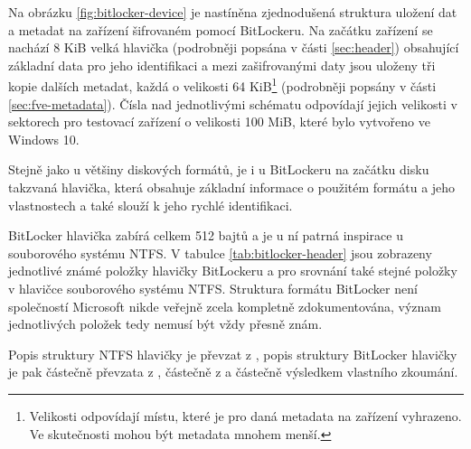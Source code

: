 Na obrázku \ref{fig:bitlocker-device} je nastíněna zjednodušená struktura uložení dat a metadat na zařízení šifrovaném pomocí BitLockeru. Na začátku zařízení se nachází 8 KiB velká hlavička (podrobněji popsána v části \ref{sec:header}) obsahující základní data pro jeho identifikaci a mezi zašifrovanými daty jsou uloženy tři kopie dalších metadat, každá o velikosti 64 KiB\footnote{Velikosti odpovídají místu, které je pro daná metadata na zařízení vyhrazeno. Ve skutečnosti mohou být metadata mnohem menší.} (podrobněji popsány v části \ref{sec:fve-metadata}). Čísla nad jednotlivými  schématu odpovídají jejich velikosti v sektorech pro testovací zařízení o velikosti 100 MiB, které bylo vytvořeno ve Windows 10.

\label{sec:header}

Stejně jako u většiny diskových formátů, je i u BitLockeru na začátku disku takzvaná hlavička, která obsahuje základní informace o použitém formátu a jeho vlastnostech a také slouží k jeho rychlé identifikaci.

BitLocker hlavička zabírá celkem 512 bajtů a je u ní patrná inspirace u souborového systému NTFS. V tabulce \ref{tab:bitlocker-header} jsou zobrazeny jednotlivé známé položky hlavičky BitLockeru a pro srovnání také stejné položky v hlavičce souborového systému NTFS. Struktura formátu BitLocker není společností Microsoft nikde veřejně zcela kompletně zdokumentována, význam jednotlivých položek tedy nemusí být vždy přesně znám.

Popis struktury NTFS hlavičky je převzat z \cite{Carrier2005}, popis struktury BitLocker hlavičky je pak částečně převzata z \cite{Metz2011}, částečně z \cite{Ferguson2006} a částečně výsledkem vlastního zkoumání.

